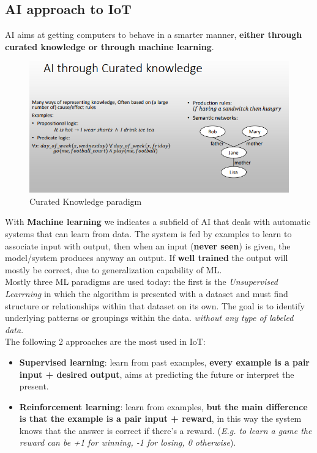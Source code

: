 \documentclass[10pt,a4paper]{report}
\theoremstyle{definition}
\begin{document}
\subsection{AI approach to IoT}\label{sec:the-ai-approach-to-iot}
AI aims at getting computers to behave in a smarter manner, \textbf{either through curated knowledge or through machine learning}.

\begin{figure}[h]
	\centering
	\includegraphics[scale=0.60]{images/Pasted image 20230222192441.png}
	\caption{Curated Knowledge paradigm}
\end{figure}


With \textbf{Machine learning} we indicates a subfield of AI that deals with automatic systems that can learn from data. The system is fed by examples to learn to associate input with output, then when an input (\textbf{never seen}) is given, the model/system produces anyway an output. If \textbf{well trained} the output will mostly be correct, due to generalization capability of ML.\\
Mostly three ML paradigms are used today: the first is the \textit{Unsupervised Learrning} in which the algorithm is presented with a dataset and must find structure or relationships within that dataset on its own. The goal is to identify underlying patterns or groupings within the data. \textit{without any type of labeled data}.\\
The following 2 approaches are the most used in IoT:
\begin{itemize}
	\item 
	\textbf{Supervised learning}:  learn from past examples, \textbf{every example is a pair input + desired output}, aims at predicting the future or interpret the present.
	\item 
	\textbf{Reinforcement learning}: learn from examples, \textbf{but the main difference is that the example is a pair input + reward}, in this way the system knows that the answer is correct if there's a reward. (\textit{E.g. to learn a game the reward can be +1 for winning, -1 for losing, 0 otherwise}).
\end{itemize}
\end{document}
